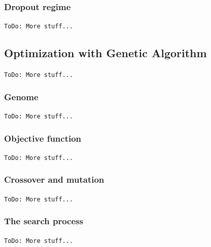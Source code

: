 \subsubsection{Dropout regime} \label{sss:dropout_regime}
\texttt{ToDo: More stuff...}


\subsection{Optimization with Genetic Algorithm}
\texttt{ToDo: More stuff...}

\subsubsection{Genome}
\texttt{ToDo: More stuff...}

\subsubsection{Objective function}
\texttt{ToDo: More stuff...}

\subsubsection{Crossover and mutation}
\texttt{ToDo: More stuff...}

\subsubsection{The search process}
\texttt{ToDo: More stuff...}


